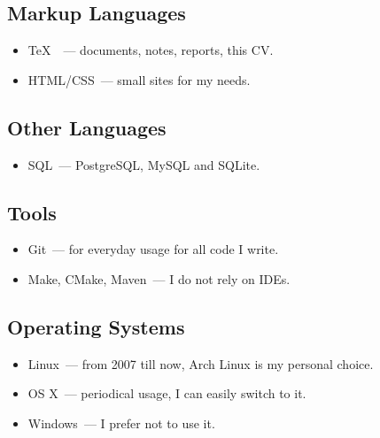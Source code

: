     \subsection*{Markup Languages}

      \begin{itemize}

        \item \TeX\ ~--- documents, notes, reports, this CV.

        \item HTML/CSS~--- small sites for my needs.

      \end{itemize}

    \subsection*{Other Languages}

      \begin{itemize}

        \item SQL~--- PostgreSQL, MySQL and SQLite.

      \end{itemize}

    \subsection*{Tools}

      \begin{itemize}

        \item Git~--- for everyday usage for all code I write.

        \item Make, CMake, Maven~--- I do not rely on IDEs.

      \end{itemize}

    \subsection*{Operating Systems}

      \begin{itemize}

        \item Linux~--- from 2007 till now, Arch Linux is my personal choice.

        \item OS X~--- periodical usage, I can easily switch to it.

        \item Windows~--- I prefer not to use it.

      \end{itemize}


